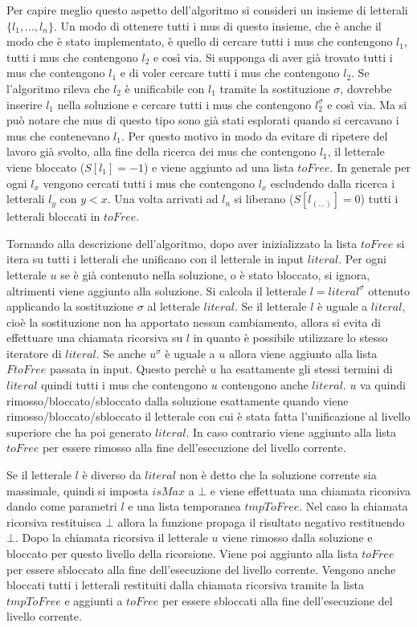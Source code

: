 \documentclass[./main.tex]{subfiles}
\begin{document}
Per capire meglio questo aspetto dell'algoritmo si consideri un insieme di 
letterali $\{l_1, ... , l_n\}$. Un modo di ottenere tutti i mus di questo insieme,
che è anche il modo che è stato implementato,
è quello di cercare tutti i mus che contengono $l_1$, tutti i mus che contengono $l_2$ e così via.
Si supponga di aver già trovato tutti i mus che contengono $l_1$ e di 
voler cercare tutti i mus che contengono $l_2$. 
Se l'algoritmo rileva che $l_2$ è unificabile con $l_1$ tramite la sostituzione $\sigma$,
dovrebbe inserire $l_1$ nella soluzione e cercare tutti i mus
che contengono $l_2^\sigma$ e così via.
Ma si può notare che mus di questo tipo sono già stati esplorati quando 
si cercavano i mus che contenevano $l_1$.
Per questo motivo in modo da evitare di ripetere del lavoro già svolto,
alla fine della ricerca dei mus che contengono $l_1$, il letterale viene
bloccato ($S[l_1] = -1$) e viene aggiunto ad una lista $toFree$.
In generale per ogni $l_x$ vengono cercati tutti i mus che contengono $l_x$
escludendo dalla ricerca i letterali $l_y$ con $y < x$.
Una volta arrivati ad $l_n$ si liberano ($S[l_{(...)}] = 0$) tutti i letterali bloccati in $toFree$.

Tornando alla descrizione dell'algoritmo, dopo aver inizializzato la lista $toFree$
si itera su tutti i letterali che unificano con il letterale in input $literal$.
Per ogni letterale $u$ se è già contenuto nella soluzione, o è stato bloccato, si ignora,
altrimenti viene aggiunto alla soluzione.
Si calcola il letterale $l = literal^\sigma$ ottenuto applicando la sostituzione
$\sigma$ al letterale $literal$. 
Se il letterale $l$ è uguale a $literal$, cioè la sostituzione non ha 
apportato nessun cambiamento, 
allora si evita di effettuare una chiamata ricorsiva su $l$ in quanto è possibile
utilizzare lo stesso iteratore di $literal$. 
Se anche $u^\sigma$ è uguale a $u$ allora viene aggiunto alla lista $FtoFree$ passata in input.
Questo perchè $u$ ha esattamente gli stessi termini di $literal$ quindi tutti i mus che contengono $u$ contengono anche $literal$.
$u$ va quindi rimosso/bloccato/sbloccato dalla soluzione esattamente quando viene rimosso/bloccato/sbloccato il letterale
con cui è stata fatta l'unificazione al livello superiore che ha poi generato $literal$.
In caso contrario viene aggiunto alla lista $toFree$ per essere rimosso alla fine dell'esecuzione del livello corrente.

Se il letterale $l$ è diverso da $literal$ non è detto che la soluzione corrente sia massimale,
quindi si imposta $isMax$ a $\bot$ e viene effettuata una chiamata ricorsiva dando come parametri $l$
e una lista temporanea $tmpToFree$. 
Nel caso la chiamata ricorsiva restituisca $\bot$ allora la funzione propaga il risultato negativo restituendo $\bot$.
Dopo la chiamata ricorsiva il letterale $u$ viene rimosso dalla soluzione e bloccato per 
questo livello della ricorsione. Viene poi aggiunto alla lista $toFree$ per essere sbloccato 
alla fine dell'esecuzione del livello corrente.
Vengono anche bloccati tutti i letterali restituiti dalla chiamata ricorsiva tramite la lista $tmpToFree$ e aggiunti a $toFree$
per essere sbloccati alla fine dell'esecuzione del livello corrente.
\end{document}
